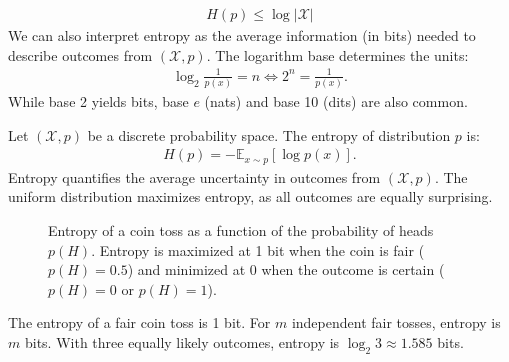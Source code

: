 \begin{align}
	\label{eq:eta-2}
	H(p) \leq \log{|\mathcal{X}|}
\end{align}
We can also interpret entropy as the average information (in bits) needed to describe outcomes from $(\mathcal{X}, p)$. The logarithm base determines the units:
\begin{align}
	\label{eq:understand-log}
	\log_2\frac{1}{p(x)} = n \iff 2^n = \frac{1}{p(x)}.
\end{align}
While base 2 yields bits, base $e$ (nats) and base 10 (dits) are also common.
\begin{definition}
	Let $(\mathcal{X}, p)$ be a discrete probability space. The \textnormal{\sffamily entropy} of distribution $p$ is:
	\begin{align}
		\label{eq:entropy}
		H(p) = - \mathbb{E}_{x \sim p} \left[ \log{p(x)} \right].
	\end{align}
	Entropy quantifies the average uncertainty in outcomes from $(\mathcal{X}, p)$. The uniform distribution maximizes entropy, as all outcomes are equally surprising.
\end{definition}
\begin{figure}[H]
	\centering
	\caption{Entropy of a coin toss as a function of the probability of heads $p(H)$. Entropy is maximized at 1 bit when the coin is fair ($p(H)=0.5$) and minimized at 0 when the outcome is certain ($p(H)=0$ or $p(H)=1$).}%
	\label{fig:entropy-coin-toss}
\end{figure}
\begin{example}
	The entropy of a fair coin toss is 1 bit. For $m$ independent fair tosses, entropy is $m$ bits. With three equally likely outcomes, entropy is $\log_2{3} \approx 1.585$ bits.
\end{example}
